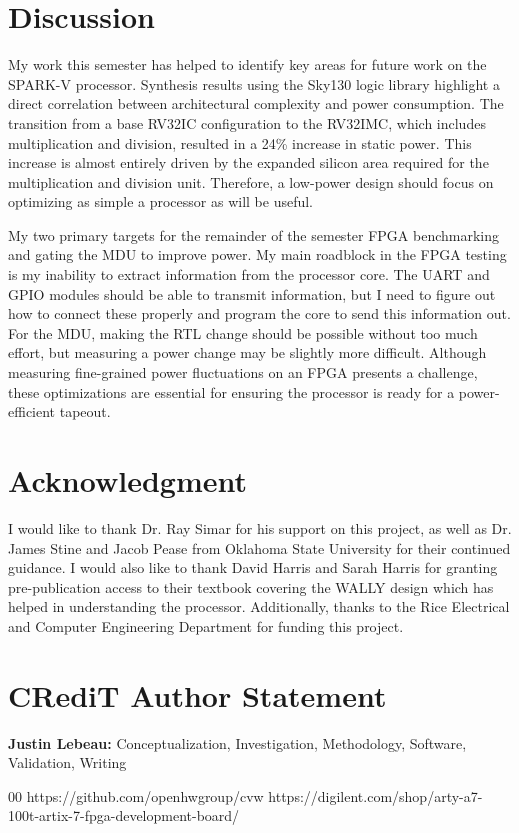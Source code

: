 \documentclass[conference]{IEEEtran}
\begin{document}
\section{Discussion}
My work this semester has helped to identify key areas for future work on the SPARK-V processor. Synthesis results using the Sky130 logic library highlight a direct correlation between architectural complexity and power consumption. The transition from a base RV32IC configuration to the RV32IMC, which includes multiplication and division, resulted in a 24\% increase in static power. This increase is almost entirely driven by the expanded silicon area required for the multiplication and division unit. Therefore, a low-power design should focus on optimizing as simple a processor as will be useful.

My two primary targets for the remainder of the semester FPGA benchmarking and gating the MDU to improve power. My main roadblock in the FPGA testing is my inability to extract information from the processor core. The UART and GPIO modules should be able to transmit information, but I need to figure out how to connect these properly and program the core to send this information out. For the MDU, making the RTL change should be possible without too much effort, but measuring a power change may be slightly more difficult. Although measuring fine-grained power fluctuations on an FPGA presents a challenge, these optimizations are essential for ensuring the processor is ready for a power-efficient tapeout.



\section*{Acknowledgment}

I would like to thank Dr. Ray Simar for his support on this project, as well as Dr. James Stine and Jacob Pease from Oklahoma State University for their continued guidance. I would also like to thank David Harris and Sarah Harris for granting pre-publication access to their textbook covering the WALLY design which has helped in understanding the processor. Additionally, thanks to the Rice Electrical and Computer Engineering Department for funding this project.

\section*{CRediT Author Statement}
\textbf{Justin Lebeau:}
Conceptualization, Investigation, Methodology, Software, Validation, Writing

\begin{thebibliography}{00}
 https://github.com/openhwgroup/cvw
 https://digilent.com/shop/arty-a7-100t-artix-7-fpga-development-board/

\end{thebibliography}
\end{document}
